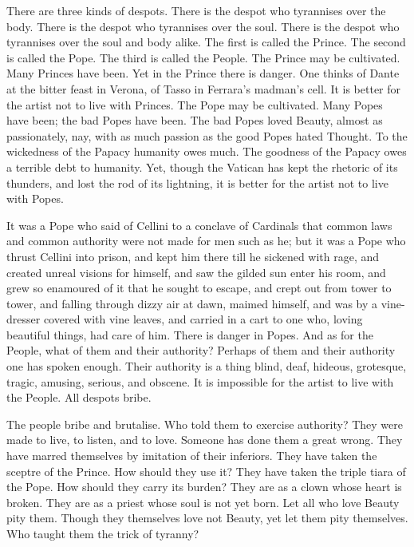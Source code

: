 There are three kinds of despots. There is the despot who tyrannises over the body. There is the despot who tyrannises over the soul. There is the despot who tyrannises over the soul and body alike. The first is called the Prince. The second is called the Pope. The third is called the People. The Prince may be cultivated. Many Princes have been. Yet in the Prince there is danger. One thinks of Dante at the bitter feast in Verona, of Tasso in Ferrara’s madman’s cell. It is better for the artist not to live with Princes. The Pope may be cultivated. Many Popes have been; the bad Popes have been. The bad Popes loved Beauty, almost as passionately, nay, with as much passion as the good Popes hated Thought. To the wickedness of the Papacy humanity owes much. The goodness of the Papacy owes a terrible debt to humanity. Yet, though the Vatican has kept the rhetoric of its thunders, and lost the rod of its lightning, it is better for the artist not to live with Popes.\par

It was a Pope who said of Cellini to a conclave of Cardinals that common laws and common authority were not made for men such as he; but it was a Pope who thrust Cellini into prison, and kept him there till he sickened with rage, and created unreal visions for himself, and saw the gilded sun enter his room, and grew so enamoured of it that he sought to escape, and crept out from tower to tower, and falling through dizzy air at dawn, maimed himself, and was by a vine-dresser covered with vine leaves, and carried in a cart to one who, loving beautiful things, had care of him. There is danger in Popes. And as for the People, what of them and their authority? Perhaps of them and their authority one has spoken enough. Their authority is a thing blind, deaf, hideous, grotesque, tragic, amusing, serious, and obscene. It is impossible for the artist to live with the People. All despots bribe.\par

The people bribe and brutalise. Who told them to exercise authority? They were made to live, to listen, and to love. Someone has done them a great wrong. They have marred themselves by imitation of their inferiors. They have taken the sceptre of the Prince. How should they use it? They have taken the triple tiara of the Pope. How should they carry its burden? They are as a clown whose heart is broken. They are as a priest whose soul is not yet born. Let all who love Beauty pity them. Though they themselves love not Beauty, yet let them pity themselves. Who taught them the trick of tyranny?\par

